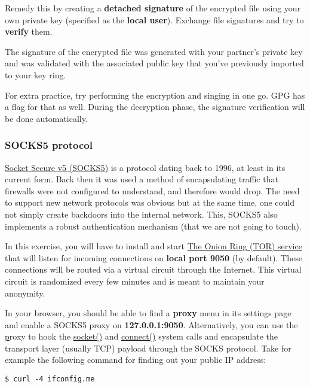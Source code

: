 Remedy this by creating a \textbf{detached signature} of the encrypted file
using your own private key (specified as the \textbf{local user}). Exchange
file signatures and try to \textbf{verify} them.

The signature of the encrypted file was generated with your partner's private
key and was validated with the associated public key that you've previously
imported to your key ring.

For extra practice, try performing the encryption and singing in one go. GPG
has a flag for that as well. During the decryption phase, the signature
verification will be done automatically.

\subsubsection{SOCKS5 protocol}

\href{https://www.rfc-editor.org/rfc/rfc1928}{Socket Secure v5 (SOCKS5)} is a
protocol dating back to 1996, at least in its current form. Back then it was
used a method of encapsulating traffic that firewalls were not configured to
understand, and therefore would drop. The need to support new network protocols
was obvious but at the same time, one could not simply create backdoors into
the internal network. This, SOCKS5 also implements a robust authentication
mechanism (that we are not going to touch).

In this exercise, you will have to install and start
\href{https://man.archlinux.org/man/tor.1}{The Onion Ring (TOR) service} that
will listen for incoming connections on \textbf{local port 9050} (by default).
These connections will be routed via a virtual circuit through the Internet.
This virtual circuit is randomized every few minutes and is meant to maintain
your anonymity.

In your browser, you should be able to find a \textbf{proxy} menu in its
settings page and enable a SOCKS5 proxy on \textbf{127.0.0.1:9050}.
Alternatively, you can use the
\href{https://man.archlinux.org/man/torsocks.1.en} proxy to hook the
\href{https://man.archlinux.org/man/socket.2.en}{socket()} and
\href{https://man.archlinux.org/man/connect.2.en}{connect()} system calls and
encapsulate the transport layer (usually TCP) payload through the SOCKS
protocol. Take for example the following command for finding out your public IP
address:

\begin{lstlisting}[style=bashstyle]
$ curl -4 ifconfig.me
\end{lstlisting}


